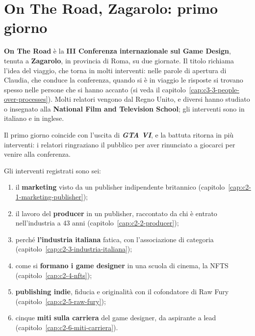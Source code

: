 
\chapter*{On The Road, Zagarolo: primo giorno}
{}

\textbf{On The Road} è la \textbf{III Conferenza internazionale sul Game Design},
tenuta a \textbf{Zagarolo}, in provincia di Roma, su due giornate. Il titolo
richiama l'idea del viaggio, che torna in molti interventi: nelle parole di
apertura di Claudia, che conduce la conferenza, quando si è in viaggio le risposte
si trovano spesso nelle persone che si hanno accanto (si veda il
capitolo~\ref{cap:c3-3-people-over-processes}). Molti relatori vengono dal Regno
Unito, e diversi hanno studiato o insegnato alla \textbf{National Film and
Television School}; gli interventi sono in italiano e in inglese.

Il primo giorno coincide con l'uscita di \textbf{\emph{GTA VI}}, e la
battuta ritorna in più interventi: i relatori ringraziano il pubblico per aver
rinunciato a giocarci per venire alla conferenza.

Gli interventi registrati sono sei:
\begin{enumerate}
  \item il \textbf{marketing} visto da un publisher indipendente britannico
        (capitolo~\ref{cap:c2-1-marketing-publisher});
  \item il lavoro del \textbf{producer} in un publisher, raccontato da chi è entrato
        nell'industria a 43 anni (capitolo~\ref{cap:c2-2-producer});
  \item perché \textbf{l'industria italiana} fatica, con l'associazione di categoria
        (capitolo~\ref{cap:c2-3-industria-italiana});
  \item come si \textbf{formano i game designer} in una scuola di cinema, la NFTS
        (capitolo~\ref{cap:c2-4-nfts});
  \item \textbf{publishing indie}, fiducia e originalità con il cofondatore di Raw
        Fury (capitolo~\ref{cap:c2-5-raw-fury});
  \item cinque \textbf{miti sulla carriera} del game designer, da aspirante a lead
        (capitolo~\ref{cap:c2-6-miti-carriera}).
\end{enumerate}

